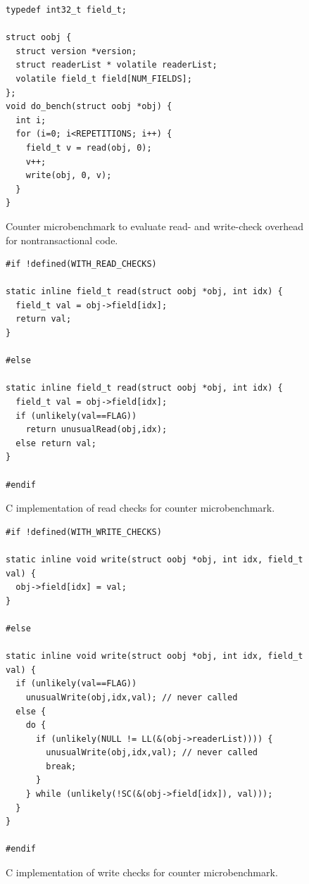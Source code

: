 \begin{figure}
\sis\fontsize{9}{10}\begin{verbatim}
typedef int32_t field_t;

struct oobj {
  struct version *version;
  struct readerList * volatile readerList;
  volatile field_t field[NUM_FIELDS];
};
void do_bench(struct oobj *obj) {
  int i;
  for (i=0; i<REPETITIONS; i++) {
    field_t v = read(obj, 0);
    v++;
    write(obj, 0, v);
  }
}
\end{verbatim}
\caption{Counter microbenchmark to evaluate read- and write-check
  overhead for nontransactional code.}
\label{fig:counter-bench}
\end{figure}

\begin{figure}
\sis\fontsize{9}{10}\begin{verbatim}
#if !defined(WITH_READ_CHECKS)

static inline field_t read(struct oobj *obj, int idx) {
  field_t val = obj->field[idx];
  return val;
}

#else

static inline field_t read(struct oobj *obj, int idx) {
  field_t val = obj->field[idx];
  if (unlikely(val==FLAG))
    return unusualRead(obj,idx);
  else return val;
}

#endif
\end{verbatim}
\caption{C implementation of read checks for counter microbenchmark.}
\label{fig:counter-read}
\end{figure}

\begin{figure}
\sis\fontsize{9}{10}\begin{verbatim}
#if !defined(WITH_WRITE_CHECKS)

static inline void write(struct oobj *obj, int idx, field_t val) {
  obj->field[idx] = val;
}

#else

static inline void write(struct oobj *obj, int idx, field_t val) {
  if (unlikely(val==FLAG))
    unusualWrite(obj,idx,val); // never called
  else {
    do {
      if (unlikely(NULL != LL(&(obj->readerList)))) {
        unusualWrite(obj,idx,val); // never called
        break;
      }
    } while (unlikely(!SC(&(obj->field[idx]), val)));
  }
}

#endif
\end{verbatim}
\caption{C implementation of write checks for counter microbenchmark.}
\label{fig:counter-write}
\end{figure}

